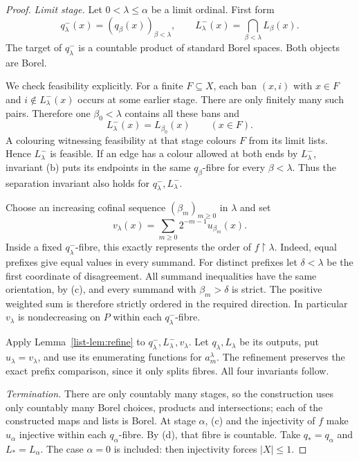 \documentclass[11pt,reqno]{amsart}
\theoremstyle{plain}
\theoremstyle{definition}
\theoremstyle{remark}
\newcommand{\restr}{\mathbin{\upharpoonright}}
\begin{document}
\begin{proof}
\smallskip
\noindent\emph{Limit stage.}
Let $0<\lambda\le\alpha$ be a limit ordinal. First form
\begin{equation*}
q^-_\lambda(x)=(q_\beta(x))_{\beta<\lambda},\qquad
L^-_\lambda(x)=\bigcap_{\beta<\lambda}L_\beta(x).
\end{equation*}
The target of $q^-_\lambda$ is a countable product of standard Borel
spaces. Both objects are Borel.

We check feasibility explicitly. For a finite $F\subseteq X$, each ban
$(x,i)$ with $x\in F$ and $i\notin L^-_\lambda(x)$ occurs at some earlier
stage. There are only finitely many such pairs. Therefore one
$\beta_0<\lambda$ contains all these bans and
\[
L^-_\lambda(x)=L_{\beta_0}(x)\qquad(x\in F).
\]
A colouring witnessing feasibility at that stage colours $F$ from its
limit lists. Hence $L^-_\lambda$ is feasible. If an edge has a colour
allowed at both ends by $L^-_\lambda$, invariant (b) puts its endpoints
in the same $q_\beta$-fibre for every $\beta<\lambda$. Thus the separation
invariant also holds for $q^-_\lambda,L^-_\lambda$.

Choose an increasing cofinal sequence $(\beta_m)_{m\ge0}$ in $\lambda$ and
set
\begin{equation*}
v_\lambda(x)=\sum_{m\ge0}2^{-m-1}u_{\beta_m}(x).
\end{equation*}
Inside a fixed $q^-_\lambda$-fibre, this exactly represents the order of
$f\restr\lambda$. Indeed, equal prefixes give equal values in every
summand. For distinct prefixes let $\delta<\lambda$ be the first
coordinate of disagreement. All summand inequalities have the same
orientation, by (c), and every summand with $\beta_m>\delta$ is strict.
The positive weighted sum is therefore strictly ordered in the required
direction. In particular $v_\lambda$ is nondecreasing on $P$ within each
$q^-_\lambda$-fibre.

Apply Lemma~\ref{list-lem:refine} to $q^-_\lambda,L^-_\lambda,v_\lambda$.
Let $q_\lambda,L_\lambda$ be its outputs, put $u_\lambda=v_\lambda$,
and use its enumerating functions for $a_m^\lambda$. The refinement
preserves the exact prefix comparison, since it only splits fibres.
All four invariants follow.

\smallskip
\noindent\emph{Termination.}
There are only countably many stages, so the construction uses only
countably many Borel choices, products and intersections; each of the
constructed maps and lists is Borel. At stage $\alpha$, (c) and the
injectivity of $f$ make $u_\alpha$ injective within each $q_\alpha$-fibre.
By (d), that fibre is countable. Take
$q_\ast=q_\alpha$ and $L_\ast=L_\alpha$. The case $\alpha=0$ is included:
then injectivity forces $|X|\le1$.
\end{proof}
\end{document}

